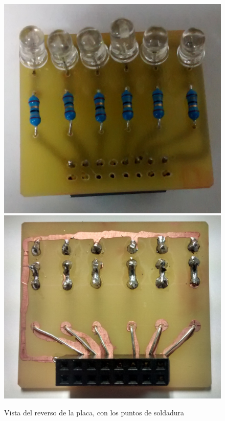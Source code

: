 \documentclass{article}
\begin{document}
\begin{figure}[H]
\centering
\includegraphics[height=0.25\textheight]{fotos/placaanverso}
\includegraphics[height=0.25\textheight]{led/placareverso}
\caption{Vista del reverso de la placa, con los puntos de soldadura}
\end{figure}
\end{document}
